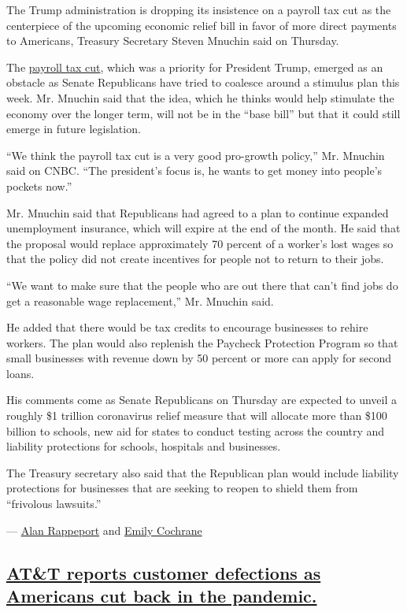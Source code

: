 The Trump administration is dropping its insistence on a payroll tax cut
as the centerpiece of the upcoming economic relief bill in favor of more
direct payments to Americans, Treasury Secretary Steven Mnuchin said on
Thursday.

The
\href{https://www.nytimes.com/2020/07/23/business/payroll-tax-cut-trump-recession.html}{payroll
tax cut}, which was a priority for President Trump, emerged as an
obstacle as Senate Republicans have tried to coalesce around a stimulus
plan this week. Mr. Mnuchin said that the idea, which he thinks would
help stimulate the economy over the longer term, will not be in the
``base bill'' but that it could still emerge in future legislation.

``We think the payroll tax cut is a very good pro-growth policy,'' Mr.
Mnuchin said on CNBC. ``The president's focus is, he wants to get money
into people's pockets now.''

Mr. Mnuchin said that Republicans had agreed to a plan to continue
expanded unemployment insurance, which will expire at the end of the
month. He said that the proposal would replace approximately 70 percent
of a worker's lost wages so that the policy did not create incentives
for people not to return to their jobs.

``We want to make sure that the people who are out there that can't find
jobs do get a reasonable wage replacement,'' Mr. Mnuchin said.

He added that there would be tax credits to encourage businesses to
rehire workers. The plan would also replenish the Paycheck Protection
Program so that small businesses with revenue down by 50 percent or more
can apply for second loans.

His comments come as Senate Republicans on Thursday are expected to
unveil a roughly \$1 trillion coronavirus relief measure that will
allocate more than \$100 billion to schools, new aid for states to
conduct testing across the country and liability protections for
schools, hospitals and businesses.

The Treasury secretary also said that the Republican plan would include
liability protections for businesses that are seeking to reopen to
shield them from ``frivolous lawsuits.''

--- \href{https://www.nytimes.com/by/alan-rappeport}{Alan Rappeport} and
\href{https://www.nytimes.com/by/emily-cochrane}{Emily Cochrane}

\hypertarget{att-reports-customer-defections-as-americans-cut-back-in-the-pandemic}{%
\subsection{\texorpdfstring{\protect\hyperlink{att-reports-customer-defections-as-americans-cut-back-in-the-pandemic}{AT\&T
reports customer defections as Americans cut back in the
pandemic.}}{AT\&T reports customer defections as Americans cut back in the pandemic.}}\label{att-reports-customer-defections-as-americans-cut-back-in-the-pandemic}}


